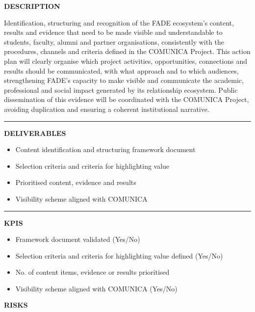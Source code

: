 \documentclass[11pt,a4paper]{scrreprt}
\newcommand{\fieldlabel}[1]{%
  {\footnotesize\sffamily\bfseries\color{mutedcolor}\MakeUppercase{#1}}\par\nopagebreak[4]
}
\newcommand{\fieldsep}{\vspace{3pt}\noindent\textcolor{bordercolor}{\rule{\linewidth}{0.4pt}}\vspace{3pt}\par}
\begin{document}
\begin{tcolorbox}[pabox={filcolor}{A.P.4.1 \enspace\textbullet\enspace Structuring, Visibility and Highlighting the Value of the Impact of the FADE Ecosystem}]

\fieldlabel{Description}
{\small Identification, structuring and recognition of the FADE ecosystem's content, results and evidence that need to be made visible and understandable to students, faculty, alumni and partner organisations, consistently with the procedures, channels and criteria defined in the COMUNICA Project. This action plan will clearly organise which project activities, opportunities, connections and results should be communicated, with what approach and to which audiences, strengthening FADE's capacity to make visible and communicate the academic, professional and social impact generated by its relationship ecosystem. Public dissemination of this evidence will be coordinated with the COMUNICA Project, avoiding duplication and ensuring a coherent institutional narrative. 
 }\par
\fieldsep
\fieldlabel{Deliverables}
{\small \begin{itemize}[noitemsep,topsep=2pt]
\item Content identification and structuring framework document
\item Selection criteria and criteria for highlighting value
\item Prioritised content, evidence and results
\item Visibility scheme aligned with COMUNICA
\end{itemize}}\par
\fieldsep
\fieldlabel{KPIs}
{\small \begin{itemize}[noitemsep,topsep=2pt]
\item Framework document validated (Yes/No)
\item Selection criteria and criteria for highlighting value defined (Yes/No)
\item No. of content items, evidence or results prioritised
\item Visibility scheme aligned with COMUNICA (Yes/No)
\end{itemize}}\par
\end{tcolorbox}
\begin{tcolorbox}[riskbox]
{\footnotesize\sffamily\bfseries\color{red!50!black} RISKS}\par{}
\end{tcolorbox}
\end{document}
